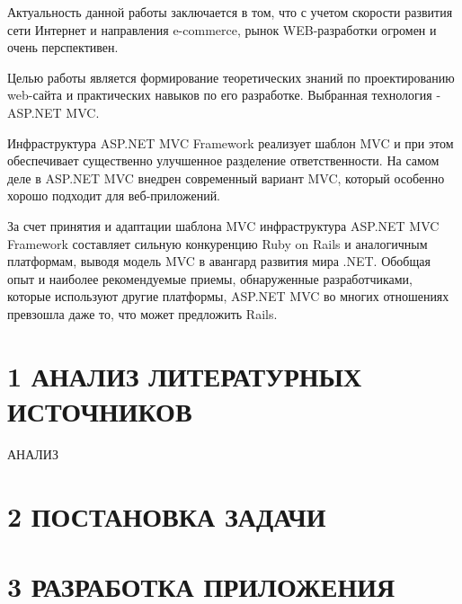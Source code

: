 \documentclass[14pt,a4paper]{extreport}
\begin{document}
	Актуальность данной работы заключается в том, что с учетом скорости развития сети Интернет и направления e-commerce, рынок WEB-разработки огромен и очень перспективен.\par
	Целью работы является формирование теоретических знаний по проектированию web-сайта и практических навыков по его разработке. Выбранная технология - ASP.NET MVC.\par
	Инфраструктура ASP.NET MVC Framework реализует шаблон MVC и при этом обеспечивает существенно улучшенное разделение ответственности. На самом деле в ASP.NET MVC внедрен современный вариант MVC, который особенно хорошо подходит для веб-приложений.\par
	За счет принятия и адаптации шаблона MVC инфраструктура ASP.NET MVC Framework составляет сильную конкуренцию Ruby on Rails и аналогичным платформам, выводя модель MVC в авангард развития мира .NET. Обобщая опыт и наиболее рекомендуемые приемы, обнаруженные разработчиками, которые используют другие платформы, ASP.NET MVC во многих отношениях превзошла даже то, что может предложить Rails.\par	

	\newpage
	\section*{\normalsize\hspace{4ex}1 АНАЛИЗ ЛИТЕРАТУРНЫХ ИСТОЧНИКОВ}
	\hspace{4ex} АНАЛИЗ

	\newpage
	\section*{\normalsize\hspace{2ex}2 ПОСТАНОВКА ЗАДАЧИ}

	\newpage
	\section*{\normalsize\hspace{4ex}3 РАЗРАБОТКА ПРИЛОЖЕНИЯ}
\end{document}
